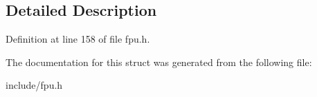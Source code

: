 \subsection{Detailed Description}


Definition at line 158 of file fpu.\-h.



The documentation for this struct was generated from the following file\-:\begin{DoxyCompactItemize}
\item 
include/fpu.\-h\end{DoxyCompactItemize}

